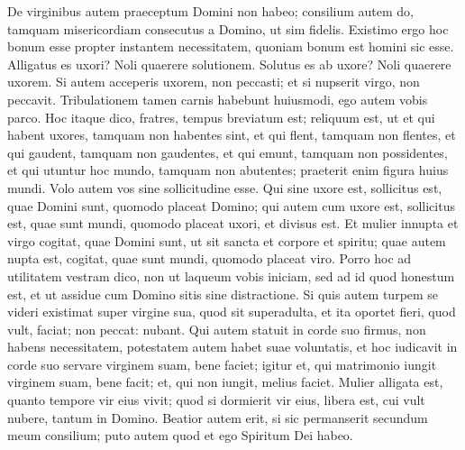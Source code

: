 \begin{biblechapter}
\begin{biblechapter}
\begin{biblechapter}
\begin{biblechapter}
\begin{biblechapter}
\begin{biblechapter}
\begin{biblechapter}
\verse De virginibus autem praeceptum Domini non habeo; consilium autem do, tamquam misericordiam consecutus a Domino, ut sim fidelis. 
\verse Existimo ergo hoc bonum esse propter instantem necessitatem, quoniam bonum est homini sic esse. 
\verse Alligatus es uxori? Noli quaerere solutionem. Solutus es ab uxore? Noli quaerere uxorem. 
\verse Si autem acceperis uxorem, non peccasti; et si nupserit virgo, non peccavit. Tribulationem tamen carnis habebunt huiusmodi, ego autem vobis parco. 
\verse Hoc itaque dico, fratres, tempus breviatum est; reliquum est, ut et qui habent uxores, tamquam non habentes sint, 
\verse et qui flent, tamquam non flentes, et qui gaudent, tamquam non gaudentes, et qui emunt, tamquam non possidentes, 
\verse et qui utuntur hoc mundo, tamquam non abutentes; praeterit enim figura huius mundi. 
\verse Volo autem vos sine sollicitudine esse. Qui sine uxore est, sollicitus est, quae Domini sunt, quomodo placeat Domino; 
\verse qui autem cum uxore est, sollicitus est, quae sunt mundi, quomodo placeat uxori, 
 \verse et divisus est. Et mulier innupta et virgo cogitat, quae Domini sunt, ut sit sancta et corpore et spiritu; quae autem nupta est, cogitat, quae sunt mundi, quomodo placeat viro. 
\verse Porro hoc ad utilitatem vestram dico, non ut laqueum vobis iniciam, sed ad id quod honestum est, et ut assidue cum Domino sitis sine distractione.
 \verse Si quis autem turpem se videri existimat super virgine sua, quod sit superadulta, et ita oportet fieri, quod vult, faciat; non peccat: nubant. 
\verse Qui autem statuit in corde suo firmus, non habens necessitatem, potestatem autem habet suae voluntatis, et hoc iudicavit in corde suo servare virginem suam, bene faciet; 
\verse igitur et, qui matrimonio iungit virginem suam, bene facit; et, qui non iungit, melius faciet.
 \verse Mulier alligata est, quanto tempore vir eius vivit; quod si dormierit vir eius, libera est, cui vult nubere, tantum in Domino. 
\verse Beatior autem erit, si sic permanserit secundum meum consilium; puto autem quod et ego Spiritum Dei habeo.
 

\end{biblechapter}
\end{biblechapter}
\end{biblechapter}
\end{biblechapter}
\end{biblechapter}
\end{biblechapter}
\end{biblechapter}
